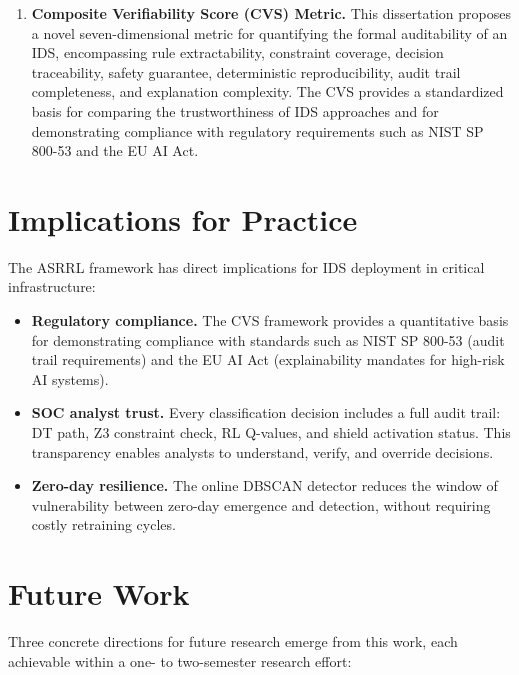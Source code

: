 \documentclass[12pt, letterpaper, oneside]{report}
\newcommand{\ASRRL}{\textsc{ASRRL}}
\begin{document}
\begin{enumerate}
    \item \textbf{Composite Verifiability Score (CVS) Metric.} This dissertation proposes a novel seven-dimensional metric for quantifying the formal auditability of an IDS, encompassing rule extractability, constraint coverage, decision traceability, safety guarantee, deterministic reproducibility, audit trail completeness, and explanation complexity. The CVS provides a standardized basis for comparing the trustworthiness of IDS approaches and for demonstrating compliance with regulatory requirements such as NIST SP 800-53 and the EU AI Act.
\end{enumerate}

\section{Implications for Practice}

The \ASRRL{} framework has direct implications for IDS deployment in critical infrastructure:

\begin{itemize}
    \item \textbf{Regulatory compliance.} The CVS framework provides a quantitative basis for demonstrating compliance with standards such as NIST SP 800-53 (audit trail requirements) and the EU AI Act (explainability mandates for high-risk AI systems).

    \item \textbf{SOC analyst trust.} Every classification decision includes a full audit trail: DT path, Z3 constraint check, RL Q-values, and shield activation status. This transparency enables analysts to understand, verify, and override decisions.

    \item \textbf{Zero-day resilience.} The online DBSCAN detector reduces the window of vulnerability between zero-day emergence and detection, without requiring costly retraining cycles.
\end{itemize}

\section{Future Work}

Three concrete directions for future research emerge from this work, each achievable within a one- to two-semester research effort:
\end{document}
